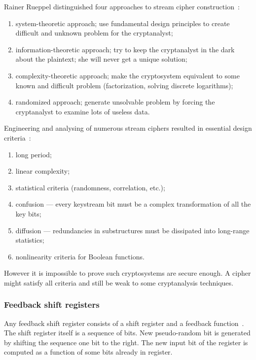 Rainer Rueppel distinguished four approaches to stream cipher
construction~\cite{schneier:applied_cryptography:2}:
\begin{enumerate}
    \item system-theoretic approach; use fundamental design principles to create
        difficult and unknown problem for the cryptanalyst;
    \item information-theoretic approach; try to keep the cryptanalyst in the
        dark about the plaintext; she will never get a unique solution;
    \item complexity-theoretic approach; make the cryptosystem equivalent to
        some known and difficult problem (factorization, solving discrete
        logarithms);
    \item randomized approach; generate unsolvable problem by forcing the
        cryptanalyst to examine lots of useless data.
\end{enumerate}
Engineering and analysing of numerous stream ciphers resulted in essential
design criteria~\cite{rueppel1986analysis}:
\begin{enumerate}
    \item long period;
    \item linear complexity;
    \item statistical criteria (randomness, correlation, etc.);
    \item confusion --- every keystream bit must be a complex transformation of
        all the key bits;
    \item diffusion --- redundancies in substructures must be dissipated into
        long-range statistics;
    \item nonlinearity criteria for Boolean functions.
\end{enumerate}
However it is impossible to prove such cryptosystems are secure enough. A cipher
might satisfy all criteria and still be weak to some cryptanalysis techniques.

\subsubsection{Feedback shift registers}

Any feedback shift register consists of a shift register and a feedback
function~\cite{schneier:applied_cryptography:2}. The shift register itself is a
sequence of bits. New pseudo-random bit is generated by shifting the sequence
one bit to the right. The new input bit of the register is computed as a
function of some bits already in register.

